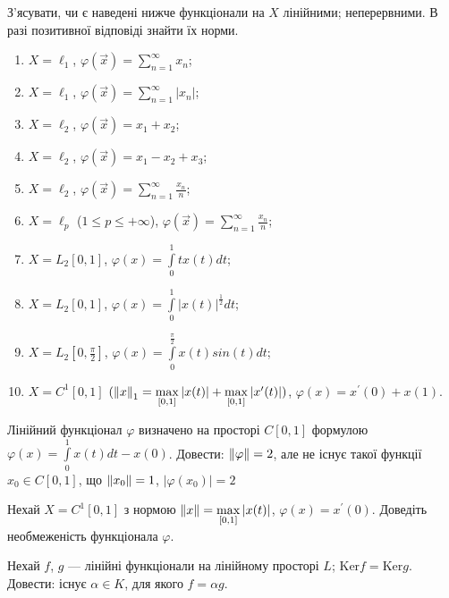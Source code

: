 \begin{exercise}
    З'ясувати, чи є наведені нижче функціонали на $X$ лінійними; 
    неперервними. В разі позитивної відповіді знайти їх норми.
    \begin{enumerate}[label=\ukr*)]
        \item $X = \ell_1$, $\varphi(\vec{x}) = \sum\limits_{n=1}^{\infty} x_n $;
        \item $X = \ell_1$, $\varphi(\vec{x}) = \sum\limits_{n=1}^{\infty} |x_n| $;
        \item $X = \ell_2$, $\varphi(\vec{x}) = x_1 + x_2 $;
        \item $X = \ell_2$, $\varphi(\vec{x}) = x_1 - x_2 + x_3$;
        \item $X = \ell_2$, $\varphi(\vec{x}) = \sum\limits_{n=1}^{\infty} \frac{x_n}{n}$;
        \item $X = \ell_p$ ($1 \leq p \leq +\infty$), $\varphi(\vec{x}) = 
        \sum\limits_{n=1}^{\infty} \frac{x_n}{n}$;
        \item $X = L_2[0,1]$, $\varphi(x) = \int\limits_0^1 tx(t)dt$;
        \item $X = L_2[0,1]$, $\varphi(x) = \int\limits_0^1 |x(t)|^{\frac{1}{2}}dt$;
        \item $X = L_2[0,\frac{\pi}{2}]$,
        $\varphi(x) = \int\limits_0^{\frac{\pi}{2}} x(t)sin(t)dt$;
        \item $X = C^1[0,1]$ $(\left\lVert x\right\rVert_1 = \max\limits_{[0,1]}|x(t)| + 
        \max\limits_{[0,1]}|x^{\prime}(t)|)$, $\varphi(x) = x^{\prime}(0) + x(1)$.
    \end{enumerate}
\end{exercise}

\begin{exercise}
    Лінійний функціонал $\varphi$ визначено на просторі $C[0, 1]$ формулою 
    $\varphi(x) = \int\limits_0^1 x(t)dt - x(0)$. Довести: $\left\lVert\varphi\right\rVert = 2$, 
    але не існує такої функції $x_0 \in C[0, 1]$, що $\left\lVert x_0\right\rVert = 1$, $|\varphi(x_0)| = 2$
\end{exercise}

\begin{exercise}
    Нехай $X = C^1[0, 1]$ з нормою $\left\lVert x\right\rVert = \max\limits_{[0, 1]}|x(t)|$, 
    $\varphi(x) = x^\prime(0)$. Доведіть необмеженість функціонала $\varphi$.
\end{exercise}

\begin{exercise}
    Нехай $f$, $g$ --- лінійні функціонали на лінійному просторі $L$; $\mathrm{Ker} f = \mathrm{Ker} g$. 
    Довести: існує $\alpha \in K$, для якого $f = \alpha g$.
\end{exercise}


